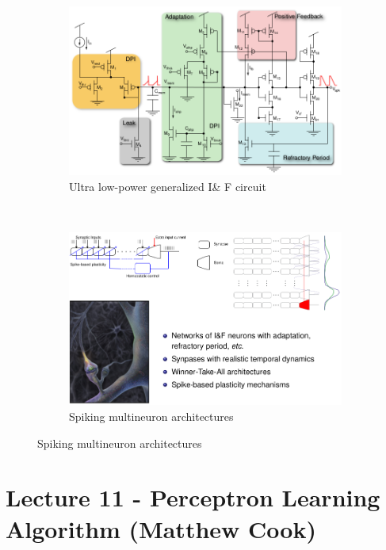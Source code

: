 \documentclass[english,11pt]{article}
\begin{document}
\begin{figure}[H]
        \centering
        \begin{subfigure}[b]{0.5\textwidth}
                \centering
\includegraphics[width=\textwidth]{IanF-circuit.png}
                \caption{Ultra low-power generalized I\& F circuit}
        \end{subfigure}%
        ~
        \begin{subfigure}[b]{0.5\textwidth}
                \centering
\includegraphics[width=\textwidth]{multineuron-circuit.png}
                \caption{Spiking multineuron architectures}
        \end{subfigure}
\end{figure}











\section{Lecture 11 - Perceptron Learning Algorithm (Matthew Cook)}
\end{document}
